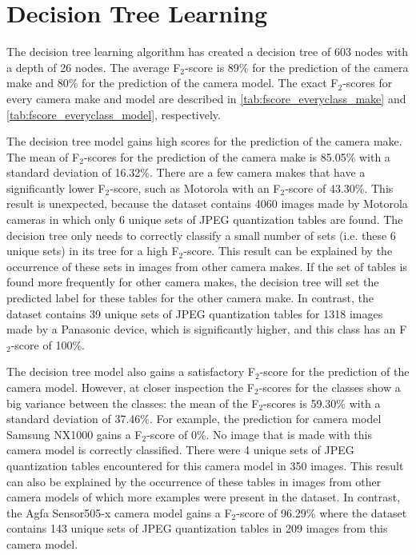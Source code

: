 \section{Decision Tree Learning}
The decision tree learning algorithm has created a decision tree of 603 nodes with a depth of 26 nodes. The average F$_2$-score is 89\% for the prediction of the camera make and 80\% for the prediction of the camera model. The exact F$_2$-scores for every camera make and model are described in \autoref{tab:fscore_everyclass_make} and \autoref{tab:fscore_everyclass_model}, respectively.

The decision tree model gains high scores for the prediction of the camera make. The mean of F$_2$-scores for the prediction of the camera make is 85.05\% with a standard deviation of 16.32\%. There are a few camera makes that have a significantly lower F$_2$-score, such as Motorola with an F$_2$-score of 43.30\%. This result is unexpected, because the dataset contains 4060 images made by Motorola cameras in which only 6 unique sets of JPEG quantization tables are found. The decision tree only needs to correctly classify a small number of sets (i.e. these 6 unique sets) in its tree for a high F$_2$-score. This result can be explained by the occurrence of these sets in images from other camera makes. If the set of tables is found more frequently for other camera makes, the decision tree will set the predicted label for these tables for the other camera make.
In contrast, the dataset contains 39 unique sets of JPEG quantization tables for 1318 images made by a Panasonic device, which is significantly higher, and this class has an F$_2$-score of 100\%.

The decision tree model also gains a satisfactory F$_2$-score for the prediction of the camera model. However, at closer inspection the F$_2$-scores for the classes show a big variance between the classes: the mean of the F$_2$-scores is 59.30\% with a standard deviation of 37.46\%. For example, the prediction for camera model Samsung NX1000 gains a F$_2$-score of 0\%. No image that is made with this camera model is correctly classified. There were 4 unique sets of JPEG quantization tables encountered for this camera model in 350 images. This result can also be explained by the occurrence of these tables in images from other camera models of which more examples were present in the dataset. In contrast, the Agfa Sensor505-x camera model gains a F$_2$-score of 96.29\% where the dataset contains 143 unique sets of JPEG quantization tables in 209 images from this camera model.

